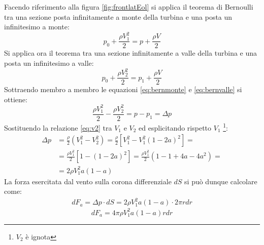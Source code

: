 Facendo riferimento alla figura \ref{fig:frontlatEol} si applica il teorema di Bernoulli tra una sezione posta infinitamente a monte della turbina e una posta un infinitesimo a monte:
\begin{equation}\label{eq:bernmonte}
p_0 + \frac{\rho V_1^2}{2} = p + \frac{\rho V}{2}
\end{equation}
Si applica ora il teorema tra una sezione infinitamente a valle della turbina e una posta un infinitesimo a valle:
\begin{equation}\label{eq:bernvalle}
p_0 + \frac{\rho V_2^2}{2} = p_1 + \frac{\rho V}{2}
\end{equation}
Sottraendo membro a membro le equazioni \ref{eq:bernmonte} e \ref{eq:bernvalle} si ottiene:
\begin{equation}
\frac{\rho V_1^2}{2} - \frac{\rho V_2^2}{2} = p - p_1 = \Delta p
\end{equation}
Sostituendo la relazione \ref{eq:v2} tra $V_1$ e $V_2$ ed esplicitando rispetto $V_1$ \footnote{$V_2$ è ignota}:
\begin{align*}
\Delta p &= \frac{\rho}{2} \left(V_1^2 - V_2^2 \right) = \frac{\rho}{2} \left[ V_1^2 - V_1^2 \left(1-2a \right)^2 \right]=\\
&= \frac{\rho V_1^2}{2} \left[ 1- \left( 1- 2a \right)^2 \right] = \frac{\rho V_1^2}{2} \left( 1- 1+4a-4a^2 \right)=\\
&= 2 \rho V_1^2 a \left( 1-a \right)
\end{align*}
La forza esercitata dal vento sulla corona differenziale $dS$ si può dunque calcolare come:
\begin{align*}
dF_a = \Delta p \cdot dS = 2 \rho V_1^2 a \left( 1-a \right) \cdot 2 \pi r dr
\end{align*}
\begin{equation}\label{eq:forza1}
dF_a = 4 \pi \rho	V_1^2 a \left( 1-a \right) r dr
\end{equation}


